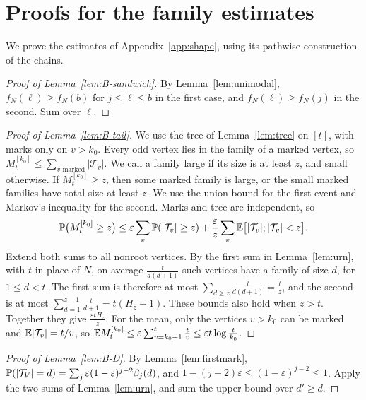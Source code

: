 \section{Proofs for the family estimates}\label{app:families}

We prove the estimates of Appendix~\ref{app:shape}, using its pathwise construction of the chains.

\begin{proof}[Proof of Lemma~\ref{lem:B-sandwich}]
By Lemma~\ref{lem:unimodal}, $f_N(\ell)\ge f_N(b)$ for $j\le\ell\le b$ in the
first case, and $f_N(\ell)\ge f_N(j)$ in the second. Sum over $\ell$.
\end{proof}

\begin{proof}[Proof of Lemma~\ref{lem:B-tail}]
We use the tree of Lemma~\ref{lem:tree} on $[t]$, with marks only on $v>k_0$.
Every odd vertex lies in the family of a marked vertex, so
$M^{[k_0]}_t\le\sum_{v\text{ marked}}\lvert\mathcal T_v\rvert$. We call a
family large if its size is at least $z$, and small otherwise. If
$M^{[k_0]}_t\ge z$, then some marked family is large, or the small marked
families have total size at least $z$. We use the union bound for the first
event and Markov's inequality for the second. Marks and tree are
independent, so
\[
 \mathbb{P}\bigl(M^{[k_0]}_t\ge z\bigr)\le\varepsilon\sum_v\mathbb{P}(\lvert\mathcal T_v\rvert\ge z)
 +\frac\varepsilon z\sum_v\mathbb{E}\bigl[\lvert\mathcal T_v\rvert;\lvert\mathcal T_v\rvert<z\bigr].
\]
Extend both sums to all nonroot vertices. By the first sum in
Lemma~\ref{lem:urn}, with $t$ in place of $N$, on average
$\frac t{d(d+1)}$ such vertices have a family of size $d$, for $1\le d<t$.
The first sum is therefore at most
$\sum_{d\ge z}\frac t{d(d+1)}=\frac tz$, and the second is at most
$\sum_{d=1}^{z-1}\frac t{d+1}=t(H_z-1)$. These bounds also hold when $z>t$.
Together they give
$\frac{\varepsilon tH_z}z$. For the mean, only the vertices $v>k_0$ can be
marked and $\mathbb{E}\lvert\mathcal T_v\rvert=t/v$, so $\mathbb{E}
M^{[k_0]}_t\le\varepsilon\sum_{v=k_0+1}^t\frac tv\le\varepsilon t\log\frac
t{k_0}$.
\end{proof}

\begin{proof}[Proof of Lemma~\ref{lem:B-D}]
By Lemma~\ref{lem:firstmark},
$\mathbb{P}(\lvert\mathcal T_V\rvert=d)=\sum_j\varepsilon(1-\varepsilon)^{j-2}\beta_j(d)$, and
$1-(j-2)\varepsilon\le(1-\varepsilon)^{j-2}\le1$. Apply the two sums of
Lemma~\ref{lem:urn}, and sum the upper bound over $d'\ge d$.
\end{proof}

